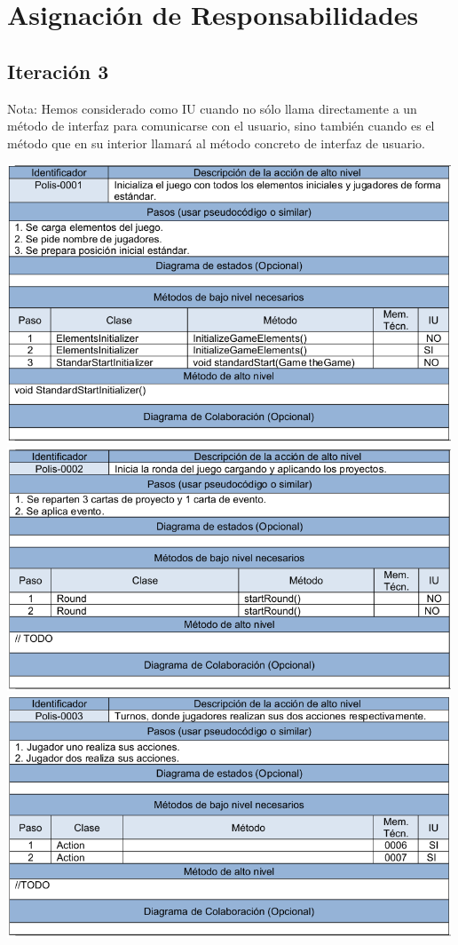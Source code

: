 \documentclass[11 pt]{book}
\begin{document}
\chapter{Asignación de Responsabilidades}
		\section*{Iteración 3}
			Nota: Hemos considerado como IU cuando no sólo llama directamente a un método de interfaz para comunicarse con el usuario, sino también cuando es el método que en su interior llamará al método concreto de interfaz de usuario.

			\begin{center}
				\includegraphics[width=500px]{responsabilities-allocation/iteration3/polis-0001.png}
				\includegraphics[width=500px]{responsabilities-allocation/iteration3/polis-0002.png}
				\includegraphics[width=500px]{responsabilities-allocation/iteration3/polis-0003.png}

\end{center}
\end{document}
